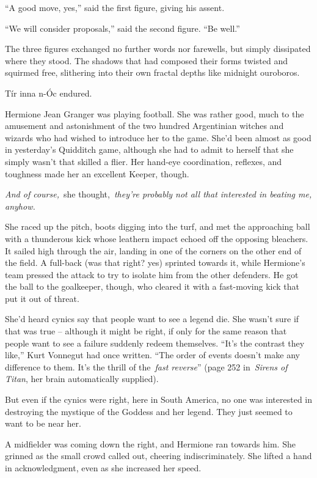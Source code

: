 ``A good move, yes,'' said the first figure, giving his assent.

``We will consider proposals,'' said the second figure. ``Be well.''

The three figures exchanged no further words nor farewells, but simply
dissipated where they stood. The shadows that had composed their forms
twisted and squirmed free, slithering into their own fractal depths like
midnight ouroboros.

Tír inna n-Óc endured.

\mybreak

Hermione Jean Granger was playing football. She was rather good, much to
the amusement and astonishment of the two hundred Argentinian witches
and wizards who had wished to introduce her to the game. She'd been
almost as good in yesterday's Quidditch game, although she had to admit
to herself that she simply wasn't that skilled a flier. Her hand-eye
coordination, reflexes, and toughness made her an excellent Keeper,
though.

\emph{And of course,}~she thought,~\emph{they're probably not all that
interested in beating me, anyhow.}

She raced up the pitch, boots digging into the turf, and met the
approaching ball with a thunderous kick whose leathern impact echoed off
the opposing bleachers. It sailed high through the air, landing in one
of the corners on the other end of the field. A full-back (was that
right? yes) sprinted towards it, while Hermione's team pressed the
attack to try to isolate him from the other defenders. He got the ball
to the goalkeeper, though, who cleared it with a fast-moving kick that
put it out of threat.

She'd heard cynics say that people want to see a legend die. She wasn't
sure if that was true -- although it might be right, if only for the
same reason that people want to see a failure suddenly redeem
themselves. ``It's the contrast they like,'' Kurt Vonnegut had once
written. ``The order of events doesn't make any difference to them. It's
the thrill of the~\emph{fast reverse}'' (page 252 in~\emph{Sirens of
Titan}, her brain automatically supplied).

But even if the cynics were right, here in South America, no one was
interested in destroying the mystique of the Goddess and her legend.
They just seemed to want to be near her.

A midfielder was coming down the right, and Hermione ran towards him.
She grinned as the small crowd called out, cheering indiscriminately.
She lifted a hand in acknowledgment, even as she increased her speed.

